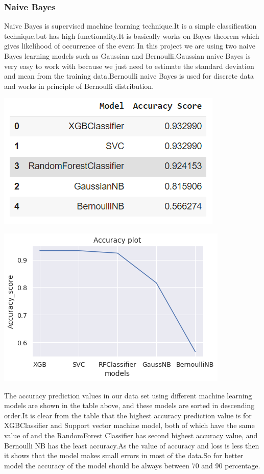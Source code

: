 \documentclass[journal,twoside,web]{ieeecolor}
\begin{document}
\subsubsection{Naive Bayes}
Naive Bayes is supervised machine learning technique.It is a simple classification technique,but has high  functionality.It is basically works on Bayes theorem which gives likelihood of occurrence of the event In this project we are using two naive Bayes learning models such as Gaussian and Bernoulli.Gaussian naive Bayes is very easy to work with because we just need to estimate the standard deviation and mean from the training data.Bernoulli naive Bayes is used for discrete data and works in principle of Bernoulli distribution.

\includegraphics[scale=0.7]{accuracy.png}
\label{fig4}

\includegraphics[scale=0.5]{line.png}

The accuracy prediction values in our data set using  different machine learning models are shown in the table above, and these models are sorted in descending order.It is clear from the table that the highest accuracy prediction value is for XGBClassifier and Support vector machine model, both of which have the same value of and the RandomForest Classifier has second highest accuracy value, and Bernoulli NB has the least accuracy.As the value of accuracy and loss is less then it shows that the model makes small errors in most of the data.So for better model the accuracy of the model should be always between 70 and 90 percentage.
\end{document}
